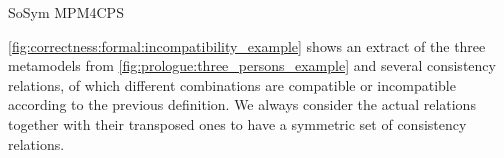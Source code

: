 \begin{copiedFrom}{SoSym MPM4CPS}
\begin{example}
\autoref{fig:correctness:formal:incompatibility_example} shows an extract of the three metamodels from \autoref{fig:prologue:three_persons_example} and several consistency relations, of which different combinations are compatible or incompatible according to the previous definition.
We always consider the actual relations together with their transposed ones to have a symmetric set of consistency relations.




\end{example}
\end{copiedFrom}

